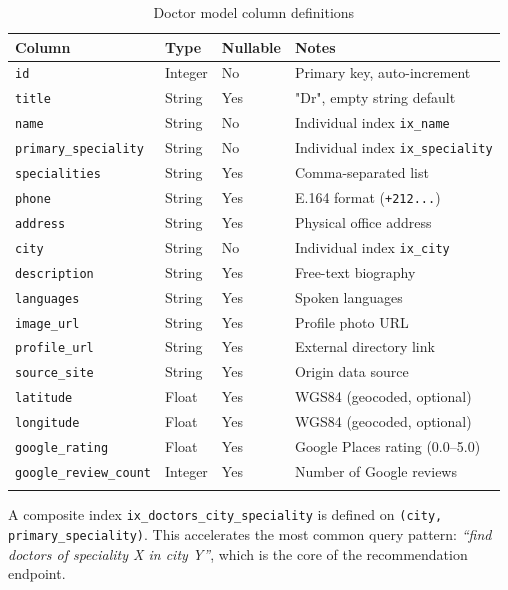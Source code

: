 \documentclass[12pt, a4paper]{article}
\newcommand{\col}[1]{\texttt{\color{teal}#1}}
\begin{document}
\begin{longtable}{p{3.8cm} p{2cm} p{1.8cm} p{5.4cm}}
  \toprule
  \textbf{Column} & \textbf{Type} & \textbf{Nullable} & \textbf{Notes} \\
  \midrule
  \col{id}                  & Integer & No  & Primary key, auto-increment \\
  \col{title}               & String  & Yes & "Dr", empty string default \\
  \col{name}                & String  & No  & Individual index \texttt{ix\_name} \\
  \col{primary\_speciality} & String  & No  & Individual index \texttt{ix\_speciality} \\
  \col{specialities}        & String  & Yes & Comma-separated list \\
  \col{phone}               & String  & Yes & E.164 format (\texttt{+212...}) \\
  \col{address}             & String  & Yes & Physical office address \\
  \col{city}                & String  & No  & Individual index \texttt{ix\_city} \\
  \col{description}         & String  & Yes & Free-text biography \\
  \col{languages}           & String  & Yes & Spoken languages \\
  \col{image\_url}          & String  & Yes & Profile photo URL \\
  \col{profile\_url}        & String  & Yes & External directory link \\
  \col{source\_site}        & String  & Yes & Origin data source \\
  \col{latitude}            & Float   & Yes & WGS84 (geocoded, optional) \\
  \col{longitude}           & Float   & Yes & WGS84 (geocoded, optional) \\
  \col{google\_rating}      & Float   & Yes & Google Places rating (0.0–5.0) \\
  \col{google\_review\_count}& Integer& Yes & Number of Google reviews \\
  \bottomrule
  \caption{Doctor model column definitions}
  \label{tab:doctor_columns}
\end{longtable}

\begin{infobox}[title={Composite Index}]
  A composite index \texttt{ix\_doctors\_city\_speciality} is defined on
  \texttt{(city, primary\_speciality)}. This accelerates the most common
  query pattern: \emph{``find doctors of speciality X in city Y''},
  which is the core of the recommendation endpoint.
\end{infobox}
\end{document}
